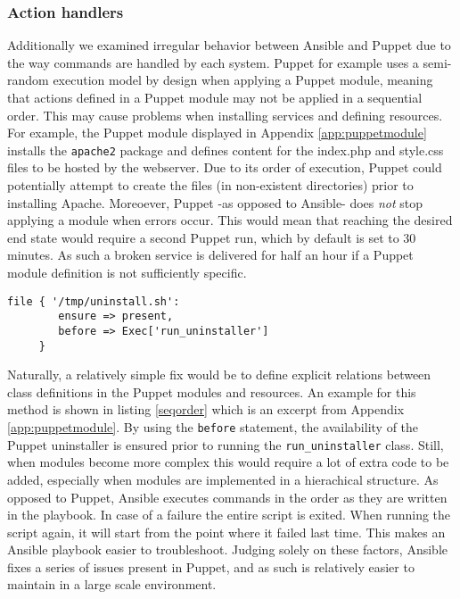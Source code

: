 \subsubsection{Action handlers}
Additionally we examined irregular behavior between Ansible and Puppet due to the way commands are handled by each system. Puppet for example uses a semi-random execution model by design when applying a Puppet module, meaning that actions defined in a Puppet module may not be applied in a sequential order. This may cause problems when installing services and defining resources. For example, the Puppet module displayed in Appendix \ref{app:puppetmodule} installs the \texttt{apache2} package and defines content for the index.php and style.css files to be hosted by the webserver. Due to its order of execution, Puppet could potentially attempt to create the files (in non-existent directories) prior to installing Apache. Moreoever, Puppet -as opposed to Ansible- does \textit{not} stop applying a module when errors occur. This would mean that reaching the desired end state would require a second Puppet run, which by default is set to 30 minutes. As such a broken service is delivered for half an hour if a Puppet module definition is not sufficiently specific. 
\\
\begin{lstlisting}[caption={Code order regulation in Puppet},label=seqorder]
     file { '/tmp/uninstall.sh': 
        ensure => present,
        before => Exec['run_uninstaller'] 
     }
\end{lstlisting}

\noindent
Naturally, a relatively simple fix would be to define explicit relations between class definitions in the Puppet modules and resources. An example for this method is shown in listing \ref{seqorder} which is an excerpt from Appendix \ref{app:puppetmodule}. By using the \texttt{before} statement, the availability of the Puppet uninstaller is ensured prior to running the \texttt{run\_uninstaller} class. Still, when modules become more complex this would require a lot of extra code to be added, especially when modules are implemented in a hierachical structure. As opposed to Puppet, Ansible executes commands in the order as they are written in the playbook. In case of a failure the entire script is exited. When running the script again, it will start from the point where it failed last time. This makes an Ansible playbook easier to troubleshoot. Judging solely on these factors, Ansible fixes a series of issues present in Puppet, and as such is relatively easier to maintain in a large scale environment.

